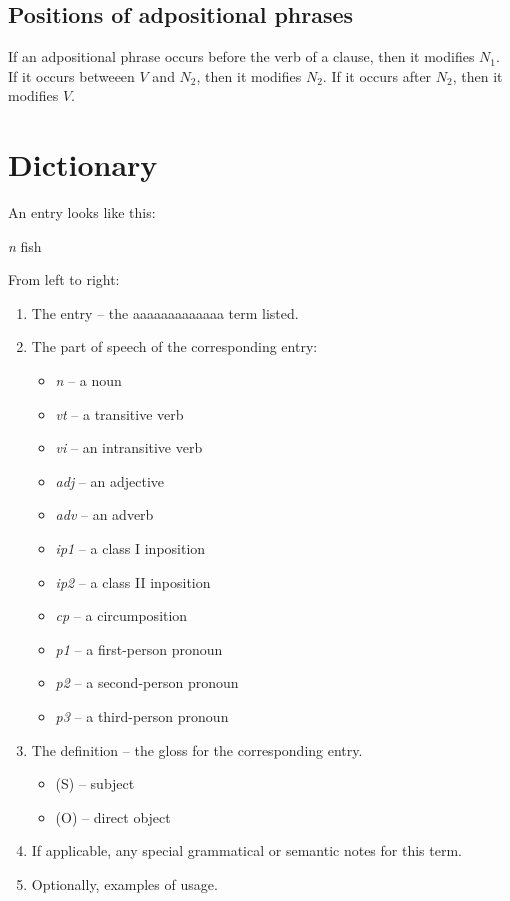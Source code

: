 \documentclass{book}
\newcommand{\lname}{aaaaaaaaaaaaa}
\begin{document}
\section{Positions of adpositional phrases}

If an adpositional phrase occurs before the verb of a clause, then it modifies $N_1$. If it occurs betweeen $V$ and $N_2$, then it modifies $N_2$. If it occurs after $N_2$, then it modifies $V$.

\appendix

\chapter{Dictionary}

An entry looks like this:

 \textit{n}
\quad fish

From left to right:

\begin{enumerate}
    \item The entry -- the \lname{} term listed.
    \item The part of speech of the corresponding entry:
    \begin{itemize}
        \item \textit{n} -- a noun
        \item \textit{vt} -- a transitive verb
        \item \textit{vi} -- an intransitive verb
        \item \textit{adj} -- an adjective
        \item \textit{adv} -- an adverb
        \item \textit{ip1} -- a class I inposition
        \item \textit{ip2} -- a class II inposition
        \item \textit{cp} -- a circumposition
        \item \textit{p1} -- a first-person pronoun
        \item \textit{p2} -- a second-person pronoun
        \item \textit{p3} -- a third-person pronoun
    \end{itemize}
    \item The definition -- the gloss for the corresponding entry.
    \begin{itemize}
        \item (S) -- subject
        \item (O) -- direct object
    \end{itemize}
    \item If applicable, any special grammatical or semantic notes for this term.
    \item Optionally, examples of usage.
\end{enumerate}

\begin{multicols}{2}
    
\end{multicols}
\end{document}
